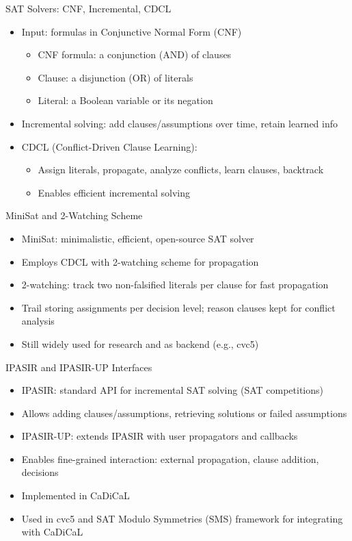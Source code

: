 \documentclass{beamer}
\begin{document}
\begin{frame}{SAT Solvers: CNF, Incremental, CDCL}
  \begin{itemize}
    \item Input: formulas in Conjunctive Normal Form (CNF)
      \begin{itemize}
        \item CNF formula: a conjunction (AND) of clauses
        \item Clause: a disjunction (OR) of literals
        \item Literal: a Boolean variable or its negation
      \end{itemize}
    \item Incremental solving: add clauses/assumptions over time, retain learned info
    \item CDCL (Conflict-Driven Clause Learning):
      \begin{itemize}
        \item Assign literals, propagate, analyze conflicts, learn clauses, backtrack
        \item Enables efficient incremental solving
      \end{itemize}
  \end{itemize}
\end{frame}

\begin{frame}{MiniSat and 2-Watching Scheme}
  \begin{itemize}
    \item MiniSat: minimalistic, efficient, open-source SAT solver
    \item Employs CDCL with 2-watching scheme for propagation
    \item 2-watching: track two non-falsified literals per clause for fast propagation
    \item Trail storing assignments per decision level; reason clauses kept for conflict analysis
    \item Still widely used for research and as backend (e.g., cvc5)
  \end{itemize}
\end{frame}

\begin{frame}{IPASIR and IPASIR-UP Interfaces}
  \begin{itemize}
    \item IPASIR: standard API for incremental SAT solving (SAT competitions)
    \item Allows adding clauses/assumptions, retrieving solutions or failed assumptions
    \item IPASIR-UP: extends IPASIR with user propagators and callbacks
    \item Enables fine-grained interaction: external propagation, clause addition, decisions
    \item Implemented in CaDiCaL
    \item Used in cvc5 and SAT Modulo Symmetries (SMS) framework for integrating with CaDiCaL
  \end{itemize}
\end{frame}
\end{document}
